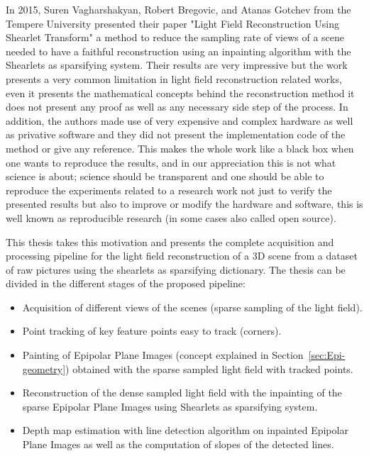 In 2015, Suren Vagharshakyan, Robert Bregovic, and Atanas Gotchev from the Tempere University presented their paper "Light Field Reconstruction Using Shearlet Transform"\cite{LF-Shearlets} a method to reduce the sampling rate of views of a scene needed to have a faithful reconstruction using an inpainting algorithm with the Shearlets as sparsifying system. Their results are very impressive but the work presents a very common limitation in light field reconstruction related works, even it presents the mathematical concepts behind the reconstruction method it does not present any proof as well as any necessary side step of the process. In addition, the authors made use of very expensive and complex hardware as well as privative software and they did not present the implementation code of the method or give any reference. This makes the whole work like a black box when one wants to reproduce the results, and in our appreciation this is not what science is about; science should be transparent and one should be able to reproduce the experiments related to a research work not just to verify the presented results but also to improve or modify the hardware and software, this is well known as reproducible research (in some cases also called open source). 

\bigskip

This thesis takes this motivation and presents the complete acquisition and processing pipeline for the light field reconstruction of a 3D scene from a dataset of raw pictures using the shearlets as sparsifying dictionary. The thesis can be divided in the different stages of the proposed pipeline:

\begin{itemize}
\item Acquisition of different views of the scenes (sparse sampling of the light field).
\item Point tracking of key feature points easy to track (corners).
\item Painting of Epipolar Plane Images (concept explained in Section~\ref{sec:Epi-geometry}) obtained with the sparse sampled light field with tracked points.
\item Reconstruction of the dense sampled light field with the inpainting of the sparse Epipolar Plane Images using Shearlets as sparsifying system. 
\item Depth map estimation with line detection algorithm on inpainted Epipolar Plane Images as well as the computation of slopes of the detected lines.
\end{itemize}

